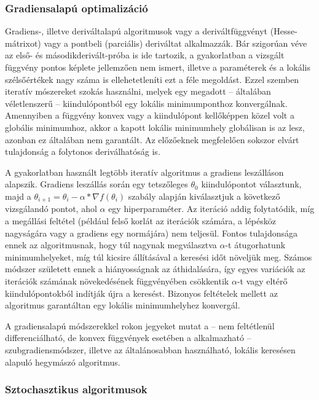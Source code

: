\subsubsection{Gradiensalapú optimalizáció}
Gradiens-, illetve deriváltalapú algoritmusok vagy a deriváltfüggvényt (Hesse-mátrixot) vagy a pontbeli (parciális) deriváltat alkalmazzák. Bár szigorúan véve az első- és másodikderivált-próba is ide tartozik, a gyakorlatban a vizsgált függvény pontos képlete jellemzően nem ismert, illetve a paraméterek és a lokális szélsőértékek nagy száma is ellehetetleníti ezt a féle megoldást. Ezzel szemben iteratív mószereket szokás használni, melyek egy megadott -- általában véletlenszerű -- kiindulópontból egy lokális minimumponthoz konvergálnak. Amennyiben a függvény konvex vagy a kiindulópont kellőképpen közel volt a globális minimumhoz, akkor a kapott lokális minimumhely globálisan is az lesz, azonban ez általában nem garantált. Az előzőeknek megfelelően sokszor elvárt tulajdonság a folytonos deriválhatóság is.


A gyakorlatban használt legtöbb iteratív algoritmus a gradiens leszálláson alapszik. Gradiens leszállás során egy tetszőleges $\theta_0$ kiindulópontot választunk, majd a $\theta_{i+1} = \theta_i - \alpha * \nabla f(\theta_i)$ szabály alapján kiválasztjuk a következő vizsgálandó pontot, ahol $\alpha$ egy hiperparaméter. Az iteráció addig folytatódik, míg a megállási feltétel (például felső korlát az iterációk számára, a lépésköz nagyságára vagy a gradiens egy normájára) nem teljesül. Fontos tulajdonsága ennek az algoritmusnak, hogy túl nagynak megválasztva $\alpha$-t átugorhatunk minimumhelyeket, míg túl kicsire állításával a keresési időt növeljük meg. Számos módszer született ennek a hiányosságnak az áthidalására, így egyes variációk az iterációk számának növekedésének függvényében csökkentik $\alpha$-t vagy eltérő kiindulópontokból indítják újra a keresést. Bizonyos feltételek mellett az algoritmus garantáltan egy lokális minimumhelyhez konvergál\cite{gradient_convergence}.


A gradiensalapú módszerekkel rokon jegyeket mutat a -- nem feltétlenül differenciálható, de konvex függvények esetében a alkalmazható -- szubgradiensmódszer, illetve az általánosabban használható, lokális keresésen alapuló hegymászó algoritmus.

\subsubsection{Sztochasztikus algoritmusok}


